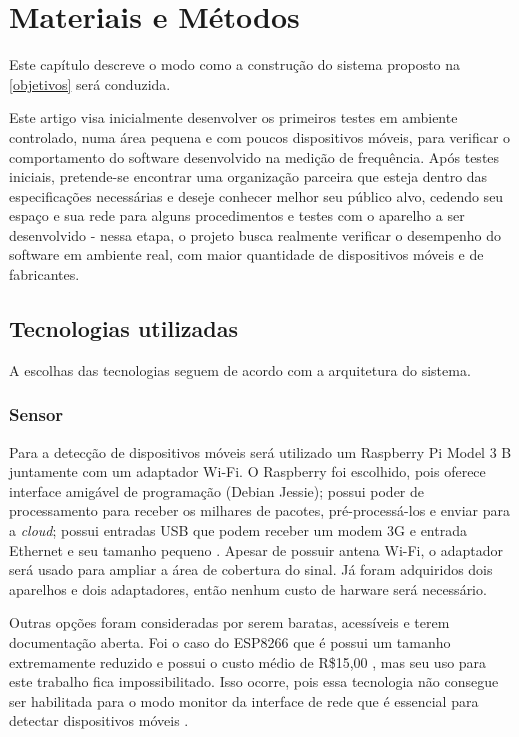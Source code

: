 
\chapter{Materiais e Métodos}
\label{metodologia}
Este capítulo descreve o modo como a construção do sistema proposto na \autoref{objetivos} será conduzida.

Este artigo visa inicialmente desenvolver os primeiros testes em ambiente controlado, numa área pequena e com poucos dispositivos móveis, para verificar o comportamento do software desenvolvido na medição de  frequência. Após testes iniciais, pretende-se encontrar uma organização parceira que esteja dentro das especificações necessárias e deseje conhecer melhor seu público alvo, cedendo seu espaço e sua rede para alguns procedimentos e testes com o aparelho a ser desenvolvido - nessa etapa, o projeto busca realmente verificar o desempenho do software em ambiente real, com maior quantidade de dispositivos móveis e de fabricantes.

\section{Tecnologias utilizadas}
A escolhas das tecnologias seguem de acordo com a arquitetura do sistema.

\subsection{Sensor}
Para a detecção de dispositivos móveis será utilizado um Raspberry Pi Model 3 B juntamente com um adaptador Wi-Fi. O Raspberry foi escolhido,
pois oferece interface amigável de programação (Debian Jessie); possui poder de processamento para receber os milhares de pacotes, pré-processá-los
e enviar para a \emph{cloud}; possui entradas USB que podem receber um modem 3G e entrada Ethernet e seu tamanho pequeno \cite{rpi2017}. Apesar de possuir
antena Wi-Fi, o adaptador será usado para ampliar a área de cobertura do sinal. Já foram adquiridos dois aparelhos e dois adaptadores, então
nenhum custo de harware será necessário.

Outras opções foram consideradas por serem baratas, acessíveis e terem documentação aberta. Foi o caso do ESP8266 que é possui um tamanho extremamente
reduzido e possui o custo médio de R\$15,00 \cite{Embarcados2015}, mas seu uso para este trabalho fica impossibilitado. Isso
ocorre, pois essa tecnologia não consegue ser habilitada para o modo monitor da interface de rede que é essencial para detectar dispositivos móveis
\cite{Puhl2016} \cite{Ferreira2016}.

